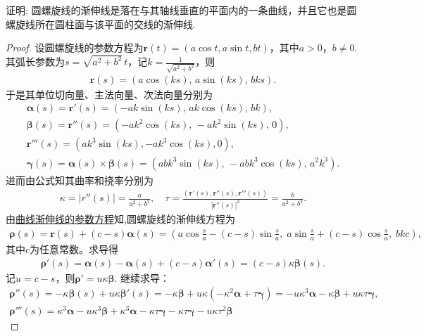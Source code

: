 \documentclass[../../main.tex]{subfiles}%
\begin{document}
\begin{example}
证明: 圆螺旋线的渐伸线是落在与其轴线垂直的平面内的一条曲线，并且它也是圆螺旋线所在圆柱面与该平面的交线的渐伸线.
\end{example}
\begin{proof}

设圆螺旋线的参数方程为$\bm{r}(t)=(a\cos t,a\sin t,bt)$，其中$a>0$，$b\neq 0$. 其弧长参数为$s=\sqrt{a^2+b^2}\,t$，记$k=\frac{1}{\sqrt{a^2+b^2}}$，则
\begin{align*}
\bm{r}(s)=\left(a\cos(ks),\,a\sin(ks),\,bks\right).
\end{align*}
于是其单位切向量、主法向量、次法向量分别为
\begin{gather*}
\bm{\alpha}(s)=\bm{r}'(s)=\left(-ak\sin(ks),\,ak\cos(ks),\,bk\right),\\
\bm{\beta}(s)=\bm{r}''(s)=\left(-ak^2\cos(ks),\,-ak^2\sin(ks),\,0\right),
\\
\bm{r}'''(s)=(ak^3\sin(ks),-ak^3\cos(ks),0),
\\
\bm{\gamma}(s)=\bm{\alpha}(s)\times\bm{\beta}(s)=\left(abk^3\sin(ks),\,-abk^3\cos(ks),\,a^2k^3\right).
\end{gather*}
进而由公式知其曲率和挠率分别为
\begin{align*}
\kappa = |r''(s)|=\frac{a}{a^2+b^2},
\quad \tau = \frac{\left( \boldsymbol{r}' \left( s \right) ,\boldsymbol{r}'' \left( s \right) ,\boldsymbol{r}''' \left( s \right) \right)}{\left| \boldsymbol{r}'' \left( s \right) \right|^2}=\frac{b}{a^2+b^2}.
\end{align*}
由\hyperref[theorem:微分几何-定理7.3]{曲线渐伸线的参数方程}知,圆螺旋线的渐伸线方程为
\begin{align}\label{eq::2jru3ju233jKJIJI}
\bm{\rho}(s)=\bm{r}(s)+(c-s)\bm{\alpha}(s)=\left( a\cos \frac{s}{a}-(c-s)\sin \frac{s}{a},\;a\sin \frac{s}{a}+(c-s)\cos \frac{s}{a},\;bkc \right),
\end{align}
其中$c$为任意常数。求导得
\begin{align*}
\bm{\rho}'(s)=\bm{\alpha}(s)-\bm{\alpha}(s)+(c-s)\bm{\alpha}'(s)=(c-s)\kappa\bm{\beta}(s).
\end{align*}
记$u=c-s$，则$\bm{\rho}'=u\kappa \bm{\beta}$. 继续求导：
\begin{gather*}
\bm{\rho}''(s)=-\kappa \bm{\beta}(s)+u\kappa \bm{\beta}'(s)=-\kappa \bm{\beta}+u\kappa (-\kappa^2\bm{\alpha}+\tau\bm{\gamma})=-u\kappa^3\bm{\alpha}-\kappa \bm{\beta}+u\kappa \tau\bm{\gamma},\\
\bm{\rho}'''(s)=\kappa^3\bm{\alpha}-u\kappa^3\bm{\beta}+\kappa^3\bm{\alpha}-\kappa\tau\bm{\gamma}-\kappa\tau\bm{\gamma}-u\kappa\tau^2\bm{\beta}

\end{gather*}
\end{proof}
\end{document}
